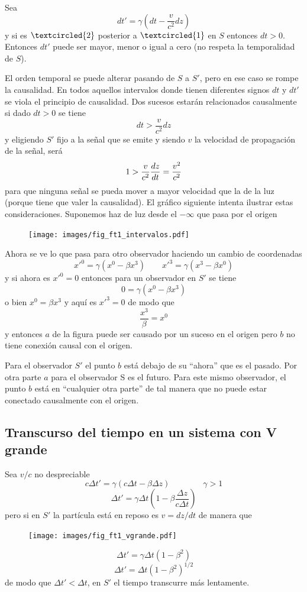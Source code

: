 \documentclass[10pt,oneside]{CBFT_book}
\begin{document}
Sea 
\[
	dt'= \gamma \left( dt - \frac{v}{c^2} dz \right)
\]
y si es $\textcircled{2}$ posterior a $\textcircled{1}$ en $S$ entonces $dt > 0 $.
Entonces $ dt'$ puede ser mayor, menor o igual a cero (no respeta la temporalidad de $S$).

El orden temporal se puede alterar pasando de $S$ a $S'$, pero en ese caso se rompe la causalidad.
En todos aquellos intervalos donde tienen diferentes signos $dt$ y $dt'$ se viola el principio de causalidad.
Dos sucesos estarán relacionados causalmente si dado $dt > 0$ se tiene 
\[
	dt > \frac{v}{c^2} dz
\]
y eligiendo $S'$ fijo a la señal que se emite y siendo $v$ la velocidad de propagación de la señal, será
\[
	1 > \frac{v}{c^2} \frac{d^{\hspace{-0.05em}} {z}}{d {t}^{\hspace{-0.05em}}} = \frac{v^2}{c^2}
\]
para que ninguna señal se pueda mover a mayor velocidad que la de la luz (porque tiene que valer la
causalidad).
El gráfico siguiente intenta ilustrar estas consideraciones.
Suponemos haz de luz desde el $-\infty$ que pasa por el origen

\begin{figure}[htb]
	\begin{center}
	\texttt{[image: images/fig\_ft1\_intervalos.pdf]}	 
	\end{center}
	\caption{}
\end{figure} 

Ahora se ve lo que pasa para otro observador haciendo un cambio de coordenadas 
\[
	x'^0 = \gamma (x^0 - \beta x^3) \qquad x'^3 = \gamma (x^3 - \beta x^0)
\]
y si ahora es $x'^0 = 0$ entonces para un observador en $S'$ se tiene 
\[
	0 = \gamma (x^0 - \beta x^3) 
\]
o bien $x^0 = \beta x^3$ y aquí es $x'^3 = 0$ de modo que 
\[
	\frac{x^3}{\beta} = x^0
\]
y entonces $a$ de la figura puede ser causado por un suceso en el origen pero $b$ no tiene 
conexión causal con el origen.

Para el observador $S'$ el punto $b$ está debajo de su ``ahora'' que es el pasado.
Por otra parte $a$ para el observador S es el futuro. Para este mismo observador, el punto
$b$ está en ``cualquier otra parte'' de tal manera que no puede estar conectado causalmente
con el origen.

\subsection{Transcurso del tiempo en un sistema con V grande}

Sea $v/c$ no despreciable 
\[
	c \Delta t' = \gamma ( c\Delta t - \beta \Delta z) \qquad \qquad \gamma >1
\]
\[
	\Delta t' = \gamma \Delta t \left( 1 - \beta \frac{\Delta z}{c\Delta t} \right)
\]
pero si en $S'$ la partícula está en reposo es $v = dz/dt $ de manera que 
\begin{figure}[htb]
	\begin{center}
	\texttt{[image: images/fig\_ft1\_vgrande.pdf]} 
	\end{center}
	\caption{}
\end{figure} 
\[
	\Delta t' = \gamma \Delta t ( 1 - \beta^2)
\]
\[
	\Delta t' = \Delta t ( 1 - \beta^2)^{1/2}
\]
de modo que $ \Delta t' < \Delta t$, en $S'$ el tiempo transcurre más lentamente.
\end{document}
